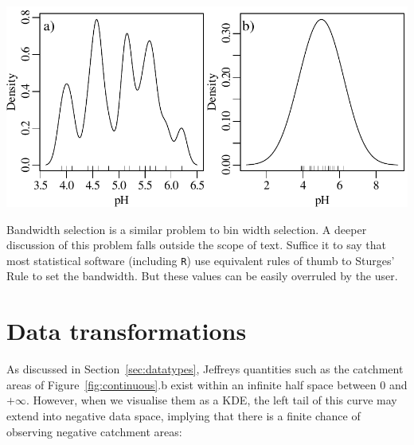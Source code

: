 \noindent\begin{minipage}[t][][b]{.6\textwidth}
  \includegraphics[width=\textwidth]{../figures/bandwidth.pdf}\medskip
\end{minipage}
\begin{minipage}[t][][t]{.4\textwidth}
\end{minipage}

Bandwidth selection is a similar problem to bin width selection.  A
deeper discussion of this problem falls outside the scope of text.
Suffice it to say that most statistical software (including
\texttt{R}) use equivalent rules of thumb to Sturges' Rule to set the
bandwidth.  But these values can be easily overruled by the user.

\section{Data transformations}
\label{sec:transformations}

As discussed in Section~\ref{sec:datatypes}, Jeffreys quantities such
as the catchment areas of Figure~\ref{fig:continuous}.b exist within
an infinite half space between 0 and $+\infty$. However, when we
visualise them as a KDE, the left tail of this curve may extend into
negative data space, implying that there is a finite chance of
observing negative catchment areas:

